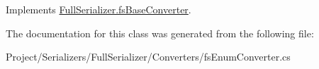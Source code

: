 Implements \hyperlink{class_full_serializer_1_1fs_base_converter_aeb0065770e53ecaac3f5dd3b5cd670d1}{Full\+Serializer.\+fs\+Base\+Converter}.



The documentation for this class was generated from the following file\+:\begin{DoxyCompactItemize}
\item 
Project/\+Serializers/\+Full\+Serializer/\+Converters/fs\+Enum\+Converter.\+cs\end{DoxyCompactItemize}
